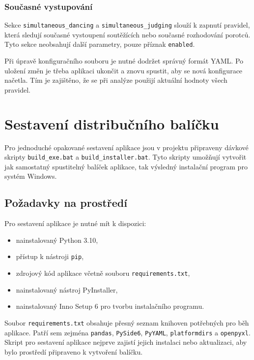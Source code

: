 \documentclass[czech, kiv, ba, he, iso690alph, pdf]{fasthesis}
\begin{document}
			\subsection{Současné vystupování}
	
				Sekce \texttt{simultaneous\_dancing} a \texttt{simultaneous\_judging} slouží k zapnutí pravidel, která sledují současné vystoupení soutěžících nebo současné rozhodování porotců. Tyto sekce neobsahují další parametry, pouze příznak \texttt{enabled}.
	
				Při úpravě konfiguračního souboru je nutné dodržet správný formát YAML. Po uložení změn je třeba aplikaci ukončit a znovu spustit, aby se nová konfigurace načetla. Tím je zajištěno, že se při analýze použijí aktuální hodnoty všech pravidel.
	
	\chapter{Sestavení distribučního balíčku}
	
		Pro jednoduché opakované sestavení aplikace jsou v projektu připraveny dávkové skripty \texttt{build\_exe.bat} a \texttt{build\_installer.bat}. Tyto skripty umožňují vytvořit jak samostatný spustitelný balíček aplikace, tak výsledný instalační program pro systém Windows.
	
		\section{Požadavky na prostředí}
	
			Pro sestavení aplikace je nutné mít k dispozici:
			\begin{itemize}
				\item nainstalovaný Python 3.10,
				\item přístup k nástroji \texttt{pip},
				\item zdrojový kód aplikace včetně souboru \texttt{requirements.txt},
				\item nainstalovaný nástroj PyInstaller,
				\item nainstalovaný Inno Setup 6 pro tvorbu instalačního programu.
			\end{itemize}
	
			Soubor \texttt{requirements.txt} obsahuje přesný seznam knihoven potřebných pro běh aplikace. Patří sem zejména \texttt{pandas}, \texttt{PySide6}, \texttt{PyYAML}, \texttt{platformdirs} a \texttt{openpyxl}. Skript pro sestavení aplikace nejprve zajistí jejich instalaci nebo aktualizaci, aby bylo prostředí připraveno k vytvoření balíčku.
	
\end{document}

